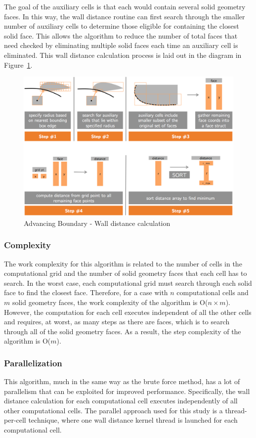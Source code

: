 \documentclass[]{aiaa-tc}%
\begin{document}
The goal of the auxiliary cells is that each would contain several
solid geometry faces. In this way, the wall distance routine can first
search through the smaller number of auxiliary cells to determine
those eligible for containing the closest solid face. This allows the
algorithm to reduce the number of total faces that need checked by
eliminating multiple solid faces each time an auxiliary cell is
eliminated. This wall distance calculation process is laid out in the diagram
in Figure~\ref{f:ab_diagram}.


\begin{figure}
  \centering
  \includegraphics[width=0.7\linewidth]{figures/auxiliary_grid/algorithm_diagram}
  \caption{Advancing Boundary - Wall distance calculation}
  \label{f:ab_diagram}
\end{figure}



\subsubsection{Complexity}

The work complexity for this algorithm is related to the number of
cells in the computational grid and the number of solid geometry faces
that each cell has to search. In the worst case, each computational
grid must search through each solid face to find the closest
face. Therefore, for a case with $n$ computational cells and $m$ solid
geometry faces, the work complexity of the algorithm is O($n \times
m$). However, the computation for each cell executes independent of
all the other cells and requires, at worst, as many steps as there are faces, which is to search
through all of the solid geometry faces. As a result, the step
complexity of the algorithm is O($m$).

\subsubsection{Parallelization}
This algorithm, much in the same way as the brute force method, has a
lot of parallelism that can be exploited for improved
performance. Specifically, the wall distance calculation for each
computational cell executes independently of all other computational
cells. The parallel approach used for this study is a thread-per-cell
technique, where one wall distance kernel thread is launched for each
computational cell.
\end{document}
